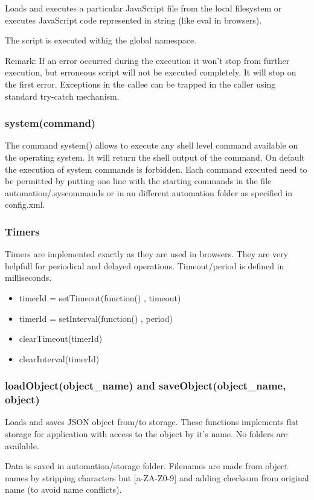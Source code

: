 Loads and executes a particular JavaScript file from the local filesystem or executes JavaScript code represented in string (like eval in browsers).

The script is executed withig the global namespace.

Remark: If an error occurred during the execution it won't stop from further execution, but erroneous script will not be executed completely. It will stop on the first error.
Exceptions in the callee can be trapped in the caller using standard try-catch mechanism.

\subsubsection{system(command)}

The command system() allows to execute any shell level command available on the operating 
system. It will return the shell output of the command.  On default the execution of 
system commands is forbidden. Each command executed need to be permitted by putting one 
line with the starting commands in the file automation/.syscommands or in an different 
automation folder as specified in config.xml.

\subsubsection{Timers}
Timers are implemented exactly as they are used in browsers. They are very helpfull for periodical and delayed operations. Timeout/period is defined in milliseconds.
\begin{itemize}
\item timerId = setTimeout(function() { }, timeout)
\item timerId = setInterval(function() { }, period)
\item clearTimeout(timerId)
\item clearInterval(timerId)
\end{itemize}

\subsubsection{loadObject(object\_name) and saveObject(object\_name, object)}
Loads and saves JSON object from/to storage. These functions implements flat storage for application with access to the object by it's name. No folders are available.

Data is saved in automation/storage folder. Filenames are made from object names by stripping characters but [a-ZA-Z0-9] and adding checksum from original name (to avoid name conflicts).

